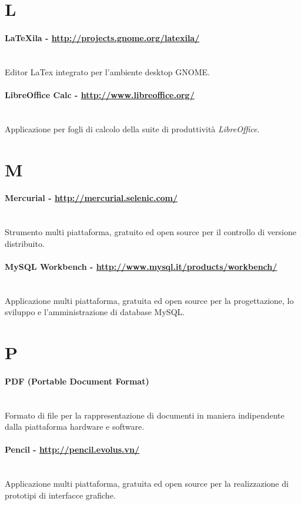 \section*{L}
\paragraph{LaTeXila - \url{http://projects.gnome.org/latexila/}} \hfill \\
Editor LaTex integrato per l'ambiente desktop GNOME.
\paragraph{LibreOffice Calc - \url{http://www.libreoffice.org/}} \hfill \\
Applicazione per fogli di calcolo della suite di produttività \textit{LibreOffice}.

\section*{M}
\paragraph{Mercurial - \url{http://mercurial.selenic.com/}} \hfill \\
Strumento multi piattaforma, gratuito ed open source per il controllo di versione distribuito.
\paragraph{MySQL Workbench - \url{http://www.mysql.it/products/workbench/}} \hfill \\
Applicazione multi piattaforma, gratuita ed open source per la progettazione, lo sviluppo e l'amministrazione di database MySQL. 

\section*{P}
\paragraph{PDF (Portable Document Format)} \hfill \\
Formato di file per la rappresentazione di documenti in maniera indipendente dalla piattaforma hardware e software.
\paragraph{Pencil - \url{http://pencil.evolus.vn/}} \hfill \\
Applicazione multi piattaforma, gratuita ed open source per la realizzazione di prototipi di interfacce grafiche.
